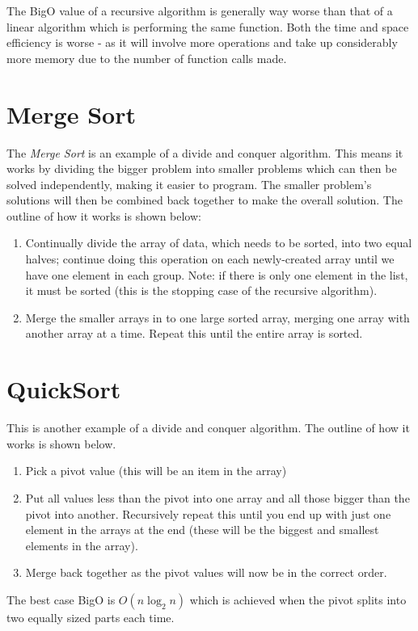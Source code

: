 
The BigO value of a recursive algorithm is generally way worse than that of a linear algorithm which is performing the same function. Both the time and space efficiency is worse - as it will involve more operations and take up considerably more memory due to the number of function calls made.

\section{Merge Sort}
The \textit{Merge Sort} is an example of a divide and conquer algorithm. This means it works by dividing the bigger problem into smaller problems which can then be solved independently, making it easier to program. The smaller problem's solutions will then be combined back together to make the overall solution. The outline of how it works is shown below:
\begin{enumerate}
    \item Continually divide the array of data, which needs to be sorted, into two equal halves; continue doing this operation on each newly-created array until we have one element in each group. Note: if there is only one element in the list, it must be sorted (this is the stopping case of the recursive algorithm).
    \item Merge the smaller arrays in to one large sorted array, merging one array with another array at a time. Repeat this until the entire array is sorted.
\end{enumerate}

\section{QuickSort}
This is another example of a divide and conquer algorithm. The outline of how it works is shown below.
\begin{enumerate}
    \item Pick a pivot value (this will be an item in the array)
    \item Put all values less than the pivot into one array and all those bigger than the pivot into another. Recursively repeat this until you end up with just one element in the arrays at the end (these will be the biggest and smallest elements in the array).
    \item Merge back together as the pivot values will now be in the correct order. 
\end{enumerate}
The best case BigO is $O(n\log_2n)$ which is achieved when the pivot splits into two equally sized parts each time.\\

